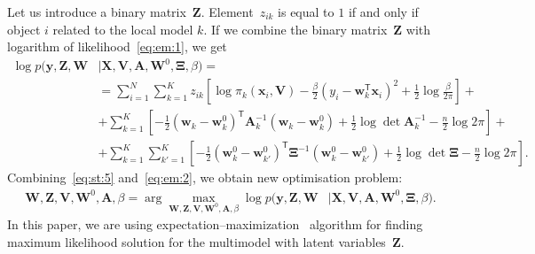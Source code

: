 \documentclass[12pt, twoside]{article}
\begin{document}
Let us introduce a binary matrix~$\mathbf{Z}$. Element~$z_{ik}$ is equal to $1$ if and only if object $i$ related to the local model $k$.
If we combine the binary matrix~$\mathbf{Z}$ with logarithm of likelihood~\eqref{eq:em:1}, we get
\[
\label{eq:em:2}
\begin{aligned}
\log p\bigr(\mathbf{y}, \mathbf{Z}, \mathbf{W}&|\mathbf{X}, \mathbf{V}, \textbf{A}, \textbf{W}^{0},  \bm{\Xi}, \beta\bigr) =\\
&= \sum_{i=1}^{N}\sum_{k=1}^{K}z_{ik}\left[\log\pi_k\left(\textbf{x}_i, \textbf{V}\right) - \frac{\beta}{2}\left(y_{i} - \textbf{w}_{k}^{\mathsf{T}}\textbf{x}_{i}\right)^{2} + \frac{1}{2}\log\frac{\beta}{2\pi}\right] +\\
&+ \sum_{k=1}^{K}\left[-\frac{1}{2}\left(\textbf{w}_{k} - \textbf{w}_{k}^{0}\right)^{\mathsf{T}}\textbf{A}_{k}^{-1}\left(\textbf{w}_{k} - \textbf{w}_{k}^{0}\right) + \frac{1}{2}\log\det\textbf{A}^{-1}_{k} - \frac{n}{2}\log2\pi\right]+\\
&+ \sum_{k=1}^{K}\sum_{k'=1}^{K}\left[-\frac{1}{2}\left(\textbf{w}_{k}^{0}-\textbf{w}_{k'}^{0}\right)^{\mathsf{T}}\bm{\Xi}^{-1}\left(\textbf{w}_{k}^{0}-\textbf{w}_{k'}^{0}\right) +\frac{1}{2}\log\det \bm{\Xi} -\frac{n}{2}\log{2\pi}\right].
\end{aligned}
\]
Combining~\eqref{eq:st:5} and~\eqref{eq:em:2}, we obtain new optimisation problem:
\[
\label{eq:em:3}
\begin{aligned}
\mathbf{W}, \mathbf{Z}, \mathbf{V}, \mathbf{W}^0, \textbf{A},  \beta = \arg\max_{\mathbf{W}, \mathbf{Z}, \mathbf{V}, \mathbf{W}^0, \textbf{A}, \beta} \log p\bigr(\mathbf{y}, \mathbf{Z}, \mathbf{W}&|\mathbf{X}, \mathbf{V}, \textbf{A}, \textbf{W}^{0}, \bm{\Xi}, \beta\bigr).
\end{aligned}
\]
In this paper, we are using expectation--maximization~\cite{bishop2006} algorithm for finding maximum likelihood solution for the multimodel with latent variables~$\mathbf{Z}$.
\end{document}
